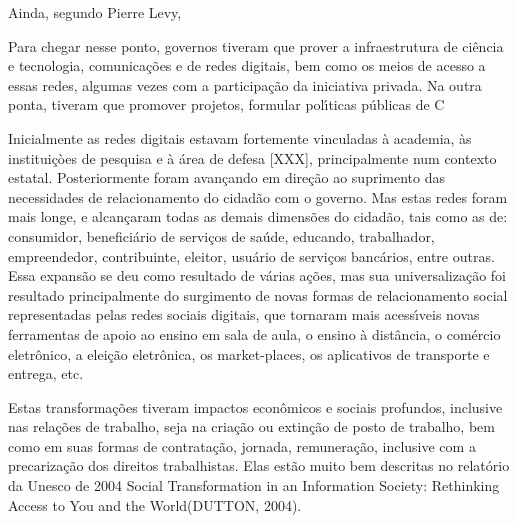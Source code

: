 \documentclass[
12pt,		%
openright,	%
twoside,  %
a4paper,			%
chapter=TITLE,		%
english,			%
french,				%
spanish,			%
brazil				%
]{USPSC-classe/USPSC_RedarTex}
\begin{document}
Ainda, segundo Pierre Levy,









\noindent\begin{center}\mbox{\centering{}}\end{center}


Para chegar nesse ponto, governos tiveram que prover a infraestrutura de ci\^encia e tecnologia, comunica\c{c}\~oes e de redes digitais, bem como os meios de acesso a essas redes, algumas vezes com a participa\c{c}\~ao da iniciativa privada. Na outra ponta, tiveram que promover projetos, formular pol\'{\i}ticas p\'ublicas de C








Inicialmente as redes digitais estavam fortemente vinculadas \`a academia, \`as institui\c{c}òes de pesquisa e \`a \'area de defesa [XXX], principalmente num contexto estatal.  Posteriormente foram avan\c{c}ando em dire\c{c}\~ao ao suprimento das necessidades de relacionamento do cidad\~ao com o governo. Mas estas redes foram mais longe, e alcan\c{c}aram todas as demais dimens\~oes do cidad\~ao, tais como as de: consumidor, benefici\'ario de servi\c{c}os de sa\'ude, educando, trabalhador, empreendedor, contribuinte, eleitor, usu\'ario de servi\c{c}os banc\'arios, entre outras.  Essa expans\~ao se deu como resultado de v\'arias a\c{c}\~oes, mas sua universaliza\c{c}\~ao foi resultado principalmente do surgimento de novas formas de relacionamento social representadas pelas redes sociais digitais, que tornaram mais acess\'{\i}veis novas ferramentas de apoio ao ensino em sala de aula, o ensino \`a dist\^ancia, o com\'ercio eletr\^onico, a elei\c{c}\~ao eletr\^onica, os \textquotedbl market-places\textquotedbl , os aplicativos de transporte e entrega, etc.








Estas transforma\c{c}\~oes tiveram impactos econ\^omicos e sociais profundos, inclusive nas rela\c{c}\~oes de trabalho, seja na cria\c{c}\~ao ou extin\c{c}\~ao de posto de trabalho, bem como em suas formas de contrata\c{c}\~ao, jornada, remunera\c{c}\~ao, inclusive com a precariza\c{c}\~ao dos direitos trabalhistas. Elas est\~ao muito bem descritas  no relat\'orio da Unesco  de 2004 \textquotedbl Social Transformation in an Information Society: Rethinking Access to You and the World\textquotedbl  (DUTTON, 2004).
\end{document}
